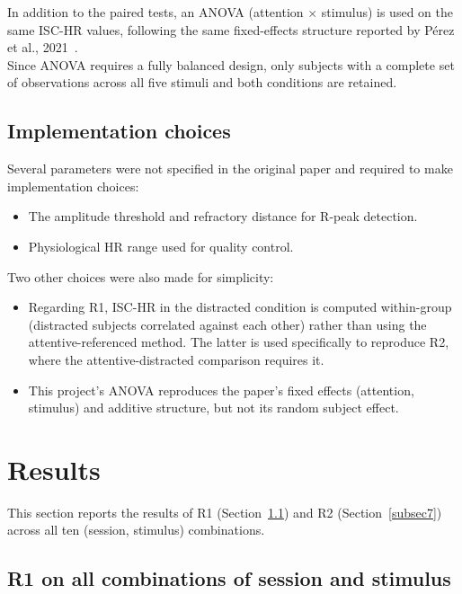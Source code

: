 \documentclass[pdflatex,sn-mathphys-num]{sn-jnl}%
\theoremstyle{thmstyleone}%
\theoremstyle{thmstyletwo}%
\theoremstyle{thmstylethree}%
\begin{document}
In addition to the paired tests, an ANOVA (attention $\times$ stimulus) is used on the same ISC-HR values, following the same fixed-effects structure reported by Pérez et al., 2021~\cite{perez2021}.\\
Since ANOVA requires a fully balanced design, only subjects with a complete set of observations across all five stimuli and both conditions are retained.

\subsection{Implementation choices}\label{subsec5}

Several parameters were not specified in the original paper and required to make implementation choices:

\begin{itemize}
\item The amplitude threshold and refractory distance for R-peak detection.
\item Physiological HR range used for quality control.
\end{itemize}

Two other choices were also made for simplicity:

\begin{itemize}
\item Regarding R1, ISC-HR in the distracted condition is computed within-group (distracted subjects correlated against each other) rather than using the attentive-referenced method. The latter is used specifically to reproduce R2, where the attentive-distracted comparison requires it.
\item This project's ANOVA reproduces the paper's fixed effects (attention, stimulus) and additive structure, but not its random subject effect.
\end{itemize}


\section{Results}\label{sec5}


This section reports the results of R1 (Section~\ref{subsec6}) and R2 (Section~\ref{subsec7}) across all ten (session, stimulus) combinations.


\subsection{R1 on all combinations of session and stimulus}\label{subsec6}
\end{document}
